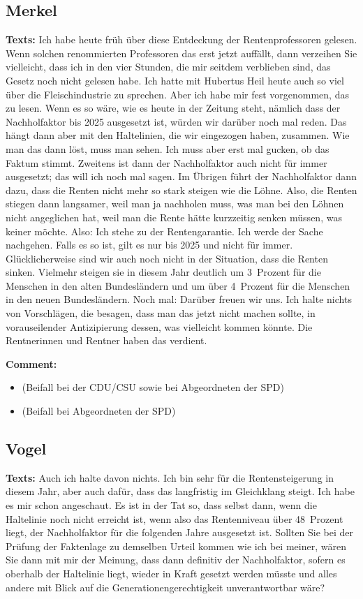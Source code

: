 \documentclass{article}
\begin{document}
\subsection{Merkel}
\noindent\textbf{Texts:} Ich habe heute früh über diese Entdeckung der Rentenprofessoren gelesen. Wenn solchen renommierten Professoren das erst jetzt auffällt, dann verzeihen Sie vielleicht, dass ich in den vier Stunden, die mir seitdem verblieben sind, das Gesetz noch nicht gelesen habe.  Ich hatte mit Hubertus Heil heute auch so viel über die Fleischindustrie zu sprechen. Aber ich habe mir fest vorgenommen, das zu lesen. Wenn es so wäre, wie es heute in der Zeitung steht, nämlich dass der Nachholfaktor bis 2025 ausgesetzt ist, würden wir darüber noch mal reden. Das hängt dann aber mit den Haltelinien, die wir eingezogen haben, zusammen. Wie man das dann löst, muss man sehen. Ich muss aber erst mal gucken, ob das Faktum stimmt. Zweitens ist dann der Nachholfaktor auch nicht für immer ausgesetzt; das will ich noch mal sagen. Im Übrigen führt der Nachholfaktor dann dazu, dass die Renten nicht mehr so stark steigen wie die Löhne. Also, die Renten stiegen dann langsamer, weil man ja nachholen muss, was man bei den Löhnen nicht angeglichen hat, weil man die Rente hätte kurzzeitig senken müssen, was keiner möchte. Also: Ich stehe zu der Rentengarantie. Ich werde der Sache nachgehen. Falls es so ist, gilt es nur bis 2025 und nicht für immer. Glücklicherweise sind wir auch noch nicht in der Situation, dass die Renten sinken. Vielmehr steigen sie in diesem Jahr deutlich um 3 Prozent für die Menschen in den alten Bundesländern und um über 4 Prozent für die Menschen in den neuen Bundesländern. Noch mal: Darüber freuen wir uns. Ich halte nichts von Vorschlägen, die besagen, dass man das jetzt nicht machen sollte, in vorauseilender Antizipierung dessen, was vielleicht kommen könnte. Die Rentnerinnen und Rentner haben das verdient. 

\noindent\textbf{Comment:}
\begin{itemize}
    \setlength\itemsep{-3pt}
    \item (Beifall bei der CDU/CSU sowie bei Abgeordneten der SPD)
    \setlength\itemsep{-3pt}
    \item (Beifall bei Abgeordneten der SPD)
\end{itemize}
\subsection{Vogel}
\noindent\textbf{Texts:} Auch ich halte davon nichts. Ich bin sehr für die Rentensteigerung in diesem Jahr, aber auch dafür, dass das langfristig im Gleichklang steigt. Ich habe es mir schon angeschaut. Es ist in der Tat so, dass selbst dann, wenn die Haltelinie noch nicht erreicht ist, wenn also das Rentenniveau über 48 Prozent liegt, der Nachholfaktor für die folgenden Jahre ausgesetzt ist. Sollten Sie bei der Prüfung der Faktenlage zu demselben Urteil kommen wie ich bei meiner, wären Sie dann mit mir der Meinung, dass dann definitiv der Nachholfaktor, sofern es oberhalb der Haltelinie liegt, wieder in Kraft gesetzt werden müsste und alles andere mit Blick auf die Generationengerechtigkeit unverantwortbar wäre?
\end{document}
